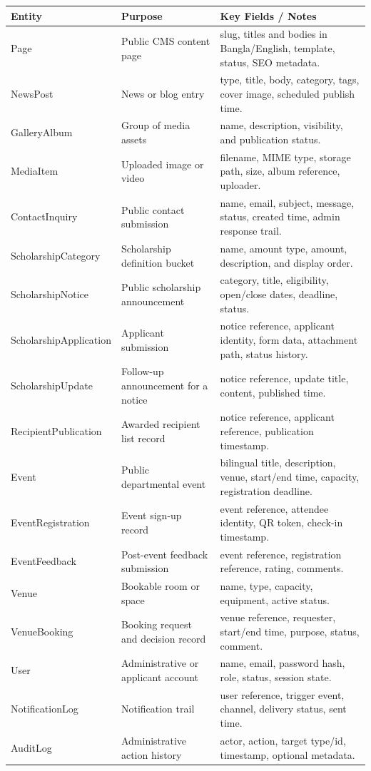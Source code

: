 \documentclass[12pt,a4paper]{article}
\newcommand{\thead}[1]{\textbf{\color{white}#1}}
\newcommand{\theadrow}{\rowcolor{headerblue}}
\begin{document}
\begin{longtable}{@{}L{3.4cm}L{5.0cm}L{5.3cm}@{}}
\theadrow \thead{Entity} & \thead{Purpose} & \thead{Key Fields / Notes} \\
\endhead
Page & Public CMS content page & slug, titles and bodies in Bangla/English, template, status, SEO metadata. \\
NewsPost & News or blog entry & type, title, body, category, tags, cover image, scheduled publish time. \\
GalleryAlbum & Group of media assets & name, description, visibility, and publication status. \\
MediaItem & Uploaded image or video & filename, MIME type, storage path, size, album reference, uploader. \\
ContactInquiry & Public contact submission & name, email, subject, message, status, created time, admin response trail. \\
ScholarshipCategory & Scholarship definition bucket & name, amount type, amount, description, and display order. \\
ScholarshipNotice & Public scholarship announcement & category, title, eligibility, open/close dates, deadline, status. \\
ScholarshipApplication & Applicant submission & notice reference, applicant identity, form data, attachment path, status history. \\
ScholarshipUpdate & Follow-up announcement for a notice & notice reference, update title, content, published time. \\
RecipientPublication & Awarded recipient list record & notice reference, applicant reference, publication timestamp. \\
Event & Public departmental event & bilingual title, description, venue, start/end time, capacity, registration deadline. \\
EventRegistration & Event sign-up record & event reference, attendee identity, QR token, check-in timestamp. \\
EventFeedback & Post-event feedback submission & event reference, registration reference, rating, comments. \\
Venue & Bookable room or space & name, type, capacity, equipment, active status. \\
VenueBooking & Booking request and decision record & venue reference, requester, start/end time, purpose, status, comment. \\
User & Administrative or applicant account & name, email, password hash, role, status, session state. \\
NotificationLog & Notification trail & user reference, trigger event, channel, delivery status, sent time. \\
AuditLog & Administrative action history & actor, action, target type/id, timestamp, optional metadata. \\
\bottomrule
\end{longtable}
\end{document}
